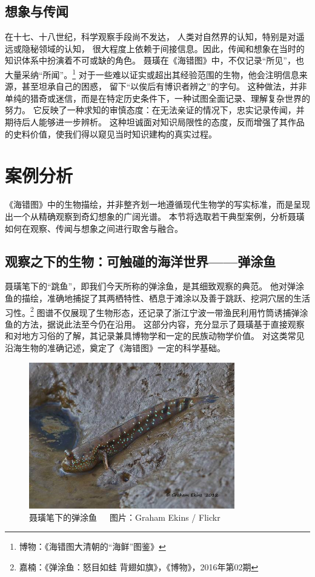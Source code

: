 \documentclass{source/Paper}
\begin{document}
\subsection{想象与传闻}
在十七、十八世纪，科学观察手段尚不发达，
人类对自然界的认知，特别是对遥远或隐秘领域的认知，
很大程度上依赖于间接信息。因此，传闻和想象在当时的知识体系中扮演着不可或缺的角色。
聂璜在《海错图》中，不仅记录“所见”，也大量采纳“所闻”。\footnote{博物：《\textlangle 海错图\textrangle 大清朝的“海鲜”图鉴》}
对于一些难以证实或超出其经验范围的生物，他会注明信息来源，甚至坦承自己的困惑，
留下“以俟后有博识者辨之”的字句。
这种做法，并非单纯的猎奇或迷信，而是在特定历史条件下，一种试图全面记录、理解复杂世界的努力。
它反映了一种求知的审慎态度：在无法亲证的情况下，忠实记录传闻，并期待后人能够进一步辨析。
这种坦诚面对知识局限性的态度，反而增强了其作品的史料价值，使我们得以窥见当时知识建构的真实过程。

\section{案例分析}
《海错图》中的生物描绘，并非整齐划一地遵循现代生物学的写实标准，而是呈现出一个从精确观察到奇幻想象的广阔光谱。
本节将选取若干典型案例，分析聂璜如何在观察、传闻与想象之间进行取舍与融合。
\subsection{观察之下的生物：可触碰的海洋世界——弹涂鱼}
聂璜笔下的“跳鱼”，即我们今天所称的弹涂鱼，是其细致观察的典范。
他对弹涂鱼的描绘，准确地捕捉了其两栖特性、栖息于滩涂以及善于跳跃、挖洞穴居的生活习性。\footnote{嘉楠：《弹涂鱼：怒目如蛙 背翅如旗》，《博物》，2016年第02期}
图谱不仅展现了生物形态，还记录了浙江宁波一带渔民利用竹筒诱捕弹涂鱼的方法，据说此法至今仍在沿用。
这部分内容，充分显示了聂璜基于直接观察和对地方习俗的了解，其记录兼具博物学和一定的民族动物学价值。
对这类常见沿海生物的准确记述，奠定了《海错图》一定的科学基础。
\begin{figure}[H]
    \centering
    \includegraphics[width=0.8\textwidth]{fig/弹涂鱼.jpg}
    \caption{聂璜笔下的弹涂鱼~~~图片：Graham Ekins / Flickr}
    \label{fig:弹涂鱼}
\end{figure}
\end{document}
